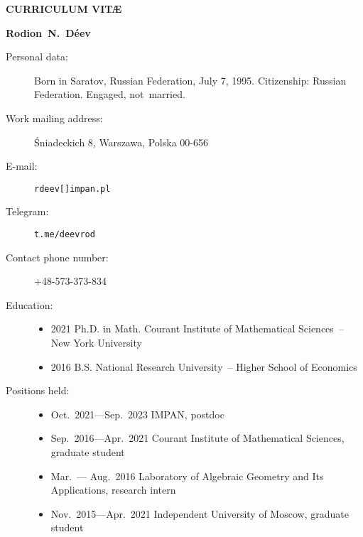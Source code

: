 \documentclass{article}
\begin{document}
\centerline{\bf\large CURRICULUM VIT\AE}

\vspace{3mm}

\centerline{\bf Rodion~N.~D\'eev}

\begin{description}

\item[Personal data:]  Born in Saratov, Russian Federation, July 7, 1995. 
Citizenship: Russian Federation. Engaged, not~married.

\item[Work mailing address:] \'Sniadeckich 8,  Warszawa,  Polska 00-656


\item[E-mail:] {\tt rdeev[]impan.pl}

\item[Telegram:] {\tt t.me/deevrod}

\item[Contact phone number:] +48-573-373-834

\item[Education:] \begin{itemize}
     \item 2021 \hspace{2mm} Ph.D. in Math. \hspace{2mm} Courant
     Institute of Mathematical Sciences~-- New York University
     \item 2016 \hspace{2mm} B.S. \hspace{2mm} National Research
     University~-- Higher School of Economics
\end{itemize}

\item[Positions held:] \begin{itemize}
     \item Oct.~2021---Sep.~2023 \hspace{2mm} IMPAN,  postdoc
     \item Sep.~2016---Apr.~2021 \hspace{2mm} Courant Institute of Mathematical Sciences,
     graduate student
     \item Mar.~--- Aug.~2016 \hspace{2mm} Laboratory of Algebraic Geometry
	and Its Applications, research intern
     \item Nov.~2015---Apr.~2021 \hspace{2mm} Independent University of Moscow,
     graduate student
\end{itemize}


\end{description}
\end{document}
